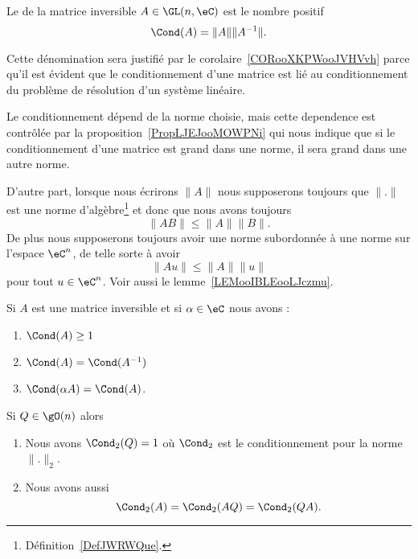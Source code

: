 \begin{definition}      \label{DEFooBKQWooJuoCGX}
	Le  de la matrice inversible \( A\in \GL(n,\eC)\) est le nombre positif
	\begin{equation}
		\Cond(A)=\| A \|\| A^{-1} \|.
	\end{equation}
\end{definition}

Cette dénomination sera justifié par le corolaire~\ref{CORooXKPWooJVHVvh} parce qu'il est évident que le conditionnement d'une matrice est lié au conditionnement du problème de résolution d'un système linéaire.

\begin{remark}
	Le conditionnement dépend de la norme choisie, mais cette dependence est contrôlée par la proposition~\ref{PropLJEJooMOWPNi} qui nous indique que si le conditionnement d'une matrice est grand dans une norme, il sera grand dans une autre norme.

	D'autre part, lorsque nous écrirons \( \| A \|\) nous supposerons toujours que \( \| . \|\) est une norme d'algèbre\footnote{Définition~\ref{DefJWRWQue}.} et donc que nous avons toujours
	\begin{equation}
		\| AB \|\leq \| A \|\| B \|.
	\end{equation}
	De plus nous supposerons toujours avoir une norme subordonnée à une norme sur l'espace \( \eC^n\), de telle sorte à avoir
	\begin{equation}
		\| Au \|\leq \| A \|\| u \|
	\end{equation}
	pour tout \( u\in\eC^n\). Voir aussi le lemme~\ref{LEMooIBLEooLJczmu}.
\end{remark}

\begin{proposition}
	Si \( A\) est une matrice inversible et si \( \alpha\in \eC\) nous avons :
	\begin{enumerate}
		\item
		      \( \Cond(A)\geq 1\)
		\item
		      \( \Cond(A)=\Cond(A^{-1})\)
		\item
		      \( \Cond(\alpha A)=\Cond(A)\).
	\end{enumerate}
	Si \( Q\in\gO(n)\) alors
	\begin{enumerate}
		\item
		      Nous avons \( \Cond_2(Q)=1\) où \( \Cond_2\) est le conditionnement pour la norme \( \| . \|_2\).
		\item
		      Nous avons aussi
		      \begin{equation}
			      \Cond_2(A)=\Cond_2(AQ)=\Cond_2(QA).
		      \end{equation}
	\end{enumerate}
\end{proposition}

